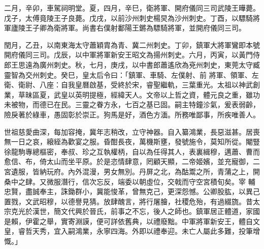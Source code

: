 \begin{pinyinscope}
 二月，辛卯，車駕祠明堂。夏，四月，辛巳，衛將軍、開府儀同三司武陵王曄薨。戊子，太傅竟陵王子良薨。戊戌，以前沙州刺史楊炅為沙州刺史。丁酉，以驃騎將軍廬陵王子卿為衛將軍。尚書右僕射鄱陽王鏘為驃騎將軍，並開府儀同三司。



 閏月，乙丑，以南東海太守蕭穎胄為青、冀二州刺史。丁卯，鎮軍大將軍鸞即本號開府儀同三司。戊辰，以中軍將軍新安王昭文為揚州刺史。六月，丙寅，以黃門侍郎王思遠為廣州刺史。秋，七月，庚戌，以中書郎蕭遙欣為兗州刺史，東莞太守臧靈智為交州刺史。癸巳，皇太后令曰：「鎮軍、車騎、左僕射、前
 將軍、領軍、左衛、衛尉、八座：自我皇曆啟基，受終於宋，睿聖繼軌，三葉重光。太祖以神武創業，草昧區夏，武皇以英明提極，經緯天人。文帝以上哲之資，體元良之重，雖功未被物，而德已在民。三靈之眷方永，七百之基已固。嗣主特鐘沴氣，爰表弱齡，險戾著於綠車，愚固彰於崇正。狗馬是好，酒色方湎。所務唯鄙事，所疾唯善人。



 世祖慈愛曲深，每加容掩，冀年志稍改，立守神器。自入纂鴻業，長惡滋甚。居喪無一日之哀，縗絰為歡宴之服。昏酣長夜，萬機斯壅，發號施令，莫知所從。閹豎徐龍駒專總樞密，奉叔、珍之互執權柄，自以為任得其人，表裏緝穆，邁蕭、曹而愈信、布，倚太山而坐平原。於是恣情肆意，罔顧天顯，二帝姬嬪，並充寵御，二宮遺服，皆納玩府。內外混漫，男女無別。丹屏之北，為酤鬻之所，青蒲之上，開桑中之肆。又微服潛行，信次忘反，端委以朝虛位，交戟而守空宮積旬矣。宰
 輔忠賢，盡誠奉主，誅鋤群小，冀能悛革，曾無克己，更深怨憾。公卿股肱，以異己置戮，文武昭穆，以德譽見猜。放肆醜言，將行屠膾，社稷危殆，有過綴旒。昔太宗克光於漢世，簡文代興於晉氏，前事之不忘，後人之師也。鎮軍居正體道，家國是賴，伊霍之舉，實寄淵謨，便可詳依舊典，以禮廢黜。中軍將軍新安王，體自文皇，睿哲天秀，宜入嗣鴻業，永寧四海。外即以禮奉迎。未亡人屬此多難，投筆增慨。」




\end{pinyinscope}
